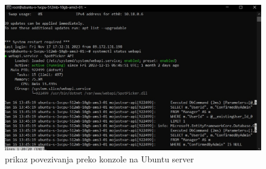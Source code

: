 			 
			 
			 \begin{figure}[hbt!]
			 	\centering
			 	\includegraphics[width=0.7\linewidth]{slike/povezivanjekonzole.png}
			 	\caption{prikaz povezivanja preko konzole na Ubuntu server}
			 	\label{fig:povezivanjekonzole}
			 \end{figure}
			 
			
			
			 
			
			
			\eject 